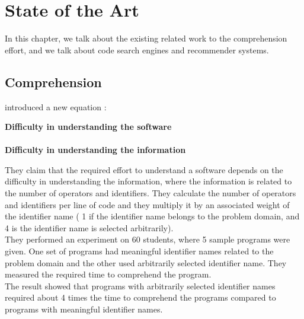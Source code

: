 \documentclass[12pt,mscthesis]{usiinfthesis}
\begin{document}
\chapter{State of the Art}
	In this chapter, we talk about the existing related work to the comprehension effort, and we talk about code search engines and recommender systems.\\ 
\section{Comprehension}
	\citet{Kushwaha:2006:ICI:1163514.1163533} introduced a new equation :\\
	\begin{center}
	 \textbf{Difficulty in understanding the software}\\
	 \approx\\
	  \textbf{Difficulty in understanding the information}
	  \end{center}

	They claim that the required effort to understand a software depends on the difficulty in understanding the information, where the information is related to the number of operators and identifiers. They calculate the number of operators and identifiers per line of code and they multiply it by an associated weight of the identifier name ( 1 if the identifier name belongs to the problem domain, and 4 is the identifier name is selected arbitrarily). \\
	They performed an experiment on 60 students, where 5 sample programs were given. One set of programs had meaningful identifier names related to the problem domain and the other used arbitrarily selected identifier name. They measured the required time to comprehend the program.\\ 
	The result showed that programs with arbitrarily selected identifier names required about 4 times the time to comprehend the programs compared to programs with meaningful identifier names.\\
\end{document}
